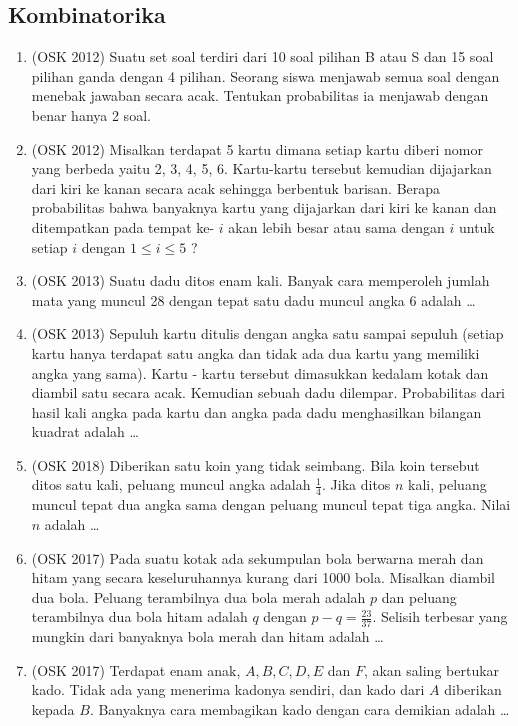 \documentclass[11pt]{scrartcl}
\begin{document}
    \subsection{Kombinatorika}
        \begin{enumerate}
            \item (OSK 2012) Suatu set soal terdiri dari 10 soal pilihan B atau S dan 15 soal pilihan ganda dengan 4 pilihan. Seorang siswa menjawab semua soal dengan menebak jawaban secara acak. Tentukan probabilitas ia menjawab dengan benar hanya 2 soal.
            
            \item (OSK 2012) Misalkan terdapat 5 kartu dimana setiap kartu diberi nomor yang berbeda yaitu 2, 3, 4, 5, 6. Kartu-kartu tersebut kemudian dijajarkan dari kiri ke kanan secara acak sehingga berbentuk barisan. Berapa probabilitas bahwa banyaknya kartu yang dijajarkan dari kiri ke kanan dan ditempatkan pada tempat ke- $i$ akan lebih besar atau sama dengan $i$ untuk setiap $i$ dengan $1 \le i \le 5$ ?
            
            \item (OSK 2013) Suatu dadu ditos enam kali. Banyak cara memperoleh jumlah mata yang muncul 28 dengan tepat satu dadu muncul angka 6 adalah \dots
            
            \item (OSK 2013) Sepuluh kartu ditulis dengan angka satu sampai sepuluh (setiap kartu hanya terdapat satu angka dan tidak ada dua kartu yang memiliki angka yang sama). Kartu - kartu tersebut dimasukkan kedalam kotak dan diambil satu secara acak. Kemudian sebuah dadu dilempar. Probabilitas dari hasil kali angka pada kartu dan angka pada dadu menghasilkan bilangan kuadrat adalah \dots
            
            \item (OSK 2018) Diberikan satu koin yang tidak seimbang. Bila koin tersebut ditos satu kali, peluang muncul angka adalah $\frac{1}{4}$. Jika ditos $n$ kali, peluang muncul tepat dua angka sama dengan peluang muncul tepat tiga angka. Nilai $n$ adalah \dots
            
            \item (OSK 2017) Pada suatu kotak ada sekumpulan bola berwarna merah dan hitam yang secara keseluruhannya kurang dari 1000 bola. Misalkan diambil dua bola. Peluang terambilnya dua bola merah adalah $p$ dan peluang terambilnya dua bola hitam adalah $q$ dengan $p-q =\frac{23}{37}$. Selisih terbesar yang mungkin dari banyaknya bola merah dan hitam adalah \dots
            
            \item (OSK 2017) Terdapat enam anak, $A, B, C, D, E$ dan $F$, akan saling bertukar kado. Tidak ada yang menerima kadonya sendiri, dan kado dari $A$ diberikan kepada $B$. Banyaknya cara membagikan kado dengan cara demikian adalah \dots
        \end{enumerate}
    
\end{document}
